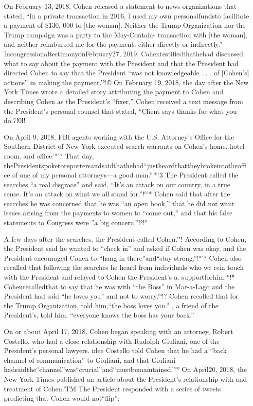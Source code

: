 On February 13, 2018, Cohen released a statement to news organizations that stated, “In a private transaction in 2016, I used my own personalfundsto facilitate a payment of \$130, 000 to [the woman].
Neither the Trump Organization nor the Trump campaign was a party to the May-Contain- transaction with [the woman], and neither reimbursed me for the payment, either directly or indirectly.”
IncongressionaltestimonyonFebruary27, 2019, Cohentestifiedthathehad discussed what to say about the payment with the President and that the President had directed Cohen to say that the President “was not knowledgeable . . . of [Cohen's] actions” in making the payment.'°!©
On February 19, 2018, the day after the New York Times wrote a detailed story attributing the payment to Cohen and describing Cohen as the President's “fixer,” Cohen received a text message from the President's personal counsel that stated, “Client says thanks for what you do.7!0l!

On April 9, 2018, FBI agents working with the U.S. Attorney's Office for the Southern District of New York executed search warrants on Cohen's home, hotel room, and office.'°'?
That day, thePresidentspoketoreportersandsaidthathehad“justheardthattheybrokeintotheoffice of one of my personal attorneys—a good man.”'°'3
The President called the searches “a real disgrace” and said, “It's an attack on our country, in a true sense.
It's an attack on what we all stand for.”!°'*
Cohen said that after the searches he was concerned that he was “an open book,” that he did not want issues arising from the payments to women to “come out,” and that his false statements to Congress were ''a big concern.”!°!°

A few days after the searches, the President called Cohen.'"!
According to Cohen, the President said he wanted to “check in” and asked if Cohen was okay, and the President encouraged Cohen to “hang in there”and“stay strong.”!°'?
Cohen also recalled that following the searches he heard from individuals who we rein touch with the President and relayed to Cohen the President's
a.
supportforhim.'°!* Cohenrecalledthat
to say that he was with “the Boss” in Mar-a-Lago and the President had said “he loves you” and not to worry.'°!?
Cohen recalled that for the Trump Organization, told him,“the boss loves you.” , a friend of the President's, told him, “everyone knows the boss has your back.”

On or about April 17, 2018, Cohen began speaking with an attorney, Robert Costello, who had a close relationship with Rudolph Giuliani, one of the President's personal lawyers.
idee Costello told Cohen that he had a “back channel of communication” to Giuliani, and that Giuliani hadsaidthe“channel”was“crucial”and“mustbemaintained.”!°
On April20, 2018, the New York Times published an article about the President's relationship with and treatment of Cohen.'TM The President responded with a series of tweets predicting that Cohen would not“flip”:

